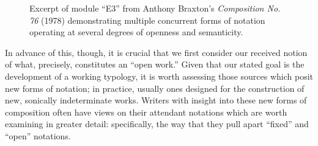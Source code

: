         \begin{figure} 
            \centering
            \captionsetup{width=.5\textwidth}
            \caption[Excerpt of module ``E3'' from Anthony Braxton's \textit{Composition No. 76} (1978) demonstrating multiple concurrent forms of notation operating at several degrees of openness.]{Excerpt of module ``E3'' from Anthony Braxton's \textit{Composition No. 76} (1978) demonstrating multiple concurrent forms of notation operating at several degrees of openness and semanticity.\footnotemark}
            \label{fig:Braxtonex}
        \end{figure}

    In advance of this, though, it is crucial that we first consider our received notion of what, precisely, constitutes an ``open work.'' Given that our stated goal is the development of a working typology, it is worth assessing those sources which posit new forms of notation; in practice, usually ones designed for the construction of new, sonically indeterminate works. Writers with insight into these new forms of composition often have views on their attendant notations which are worth examining in greater detail: specifically, the way that they pull apart ``fixed'' and ``open'' notations.





